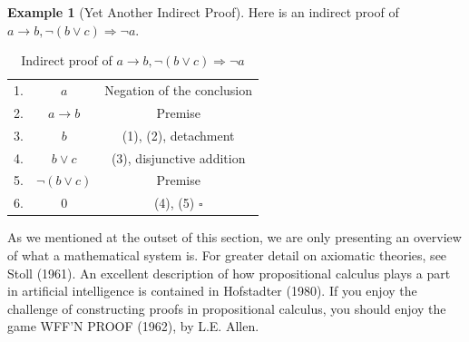 \documentclass[10pt,]{book}
\theoremstyle{plain}
\theoremstyle{definition}
\theoremstyle{definition}
\theoremstyle{definition}
\newtheorem{example}[theorem]{Example}
\theoremstyle{definition}
\begin{document}
\begin{example}[Yet Another Indirect Proof]\label{proof-yet-another}
 Here is an indirect proof of \(a \rightarrow  b, \neg (b \lor  c ) \Rightarrow  \neg  a\).%
\leavevmode%
\begin{table}
\centering
\begin{tabular}{ccc}
1.&\(a\)&  Negation of the conclusion\tabularnewline[0pt]
2.&\(a\to  b\)&Premise\tabularnewline[0pt]
3.&\(b\)&  (1), (2), detachment\tabularnewline[0pt]
4.&\(b \lor  c\)&  (3), disjunctive addition\tabularnewline[0pt]
5.&\(\neg (b \lor  c)\)&  Premise\tabularnewline[0pt]
6.&\(0\)&  (4), (5)  \(\square\)
\end{tabular}
\caption{Indirect proof of \(a \rightarrow  b, \neg (b \lor  c ) \Rightarrow  \neg  a\)\label{proof-style}}
\end{table}
\end{example}
\par
As we mentioned at the outset of this section, we are only presenting an overview of what a mathematical system is. For greater detail on axiomatic theories, see Stoll (1961). An excellent description of how propositional calculus plays a part in artificial intelligence is contained in Hofstadter (1980). If you enjoy the challenge of constructing proofs in propositional calculus, you should enjoy the game WFF'N PROOF (1962), by L.E. Allen.%
\typeout{************************************************}
\typeout{************************************************}
\end{document}
